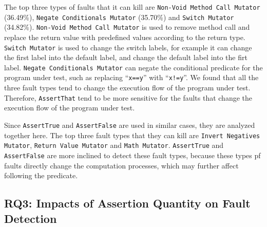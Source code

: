  The top three
types of faults that it can kill are {\tt Non-Void Method Call
Mutator} (36.49\%), {\tt Negate Conditionals Mutator} (35.70\%) and
{\tt Switch Mutator} (34.82\%). {\tt Non-Void Method Call Mutator} is
used to remove method call and replace the return value with
predefined values according to the return type. {\tt Switch Mutator}
is used to change the switch labels, for example it can change the
first label into the default label, and change the default label into
the firt label. {\tt Negate Conditionals Mutator} can negate the
conditional predicate for the program under test, such as replacing
``{\tt x==y}'' with ``{\tt x!=y}''. We found that all the three fault
types tend to change the execution flow of the program under
test. Therefore, {\tt AssertThat} tend to be more sensitive for the
faults that change the execution flow of the program under test.

 Since {\tt AssertTrue} and {\tt AssertFalse} are used in similar
cases, they are analyzed together here. The top three fault types that
they can kill are {\tt Invert Negatives Mutator}, {\tt Return Value
Mutator} and {\tt Math Mutator}.  {\tt AssertTrue} and {\tt
AssertFalse} are more inclined to detect these fault types, because
these types pf faults directly change the computation processes, which
may further affect following the predicate. 

\noindent
{}

\subsection{RQ3: Impacts of Assertion Quantity on Fault Detection}


